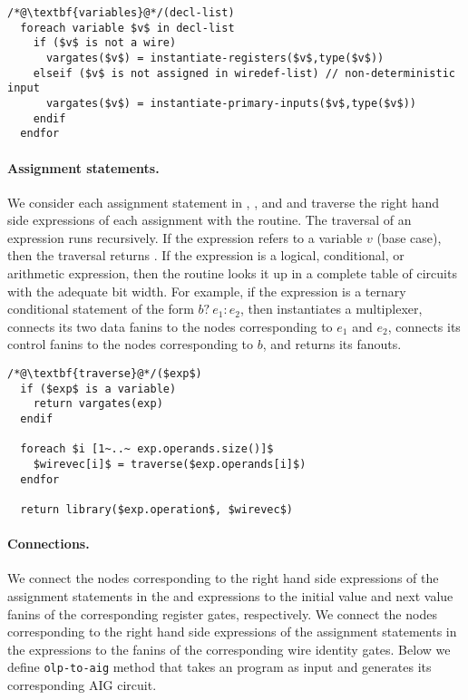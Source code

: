 \begin{lstlisting}
/*@\textbf{variables}@*/(decl-list)
  foreach variable $v$ in decl-list
    if ($v$ is not a wire) 
      vargates($v$) = instantiate-registers($v$,type($v$))
    elseif ($v$ is not assigned in wiredef-list) // non-deterministic input
      vargates($v$) = instantiate-primary-inputs($v$,type($v$))
    endif
  endfor
\end{lstlisting}


\paragraph{Assignment statements.}
We consider each assignment statement in , ,
and  and traverse the right hand side expressions of
each assignment with the  routine. 
The traversal of an expression runs recursively. 
%
If the expression refers to a variable $v$ (base case), 
then the traversal returns . 
%
If the expression is a logical, conditional, or arithmetic expression, then
the  routine looks it up in a complete table of circuits
with the adequate bit width. 
For example, if the expression is a ternary conditional statement of the
form $b?~e_1:e_2$, then  instantiates a multiplexer, 
connects its two data fanins to the nodes corresponding to $e_1$ and $e_2$, 
connects its control fanins to the nodes corresponding to $b$,
and returns its fanouts. 

\begin{lstlisting}
/*@\textbf{traverse}@*/($exp$)
  if ($exp$ is a variable) 
    return vargates(exp)
  endif

  foreach $i [1~..~ exp.operands.size()]$ 
    $wirevec[i]$ = traverse($exp.operands[i]$) 
  endfor

  return library($exp.operation$, $wirevec$)
\end{lstlisting}

\paragraph{Connections.}
We connect the nodes corresponding to the right hand side expressions 
of the assignment statements in the  and 
expressions 
to the initial value and next value fanins of the corresponding register gates, 
respectively. 
%
We connect the nodes corresponding to the right hand side expressions
of the assignment statements in the  expressions to the 
fanins of the corresponding wire identity gates. Below we define \texttt{olp-to-aig} method that takes an \caig program as input and generates its corresponding AIG circuit. 


